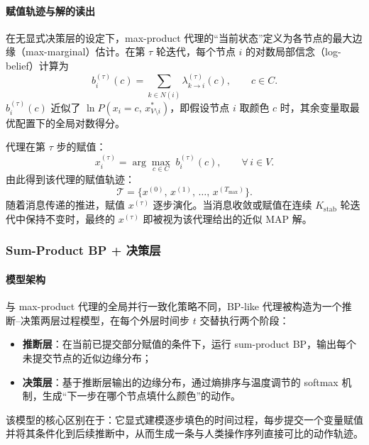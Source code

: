 \paragraph{赋值轨迹与解的读出}
在无显式决策层的设定下，max-product 代理的“当前状态”定义为各节点的最大边缘（max-marginal）估计。在第 $\tau$ 轮迭代，每个节点 $i$ 的对数局部信念（log-belief）计算为
\begin{equation}
  b_i^{(\tau)}(c)
  =
  \sum_{k\in N(i)} \lambda_{k\to i}^{(\tau)}(c),
  \qquad c\in C.
\end{equation}
$b_i^{(\tau)}(c)$ 近似了 $\ln P(x_i=c,\, x_{V\setminus i}^{*})$，即假设节点 $i$ 取颜色 $c$ 时，其余变量取最优配置下的全局对数得分。

代理在第 $\tau$ 步的赋值：
\begin{equation}
  x_i^{(\tau)}
  =
  \arg\max_{c\in C}\; b_i^{(\tau)}(c),
  \qquad \forall\, i\in V.
\end{equation}
由此得到该代理的赋值轨迹：
\begin{equation}
  \mathcal{T} = \bigl\{ x^{(0)},\, x^{(1)},\, \ldots,\, x^{(T_{\max})} \bigr\}.
\end{equation}
随着消息传递的推进，赋值 $x^{(\tau)}$ 逐步演化。当消息收敛或赋值在连续 $K_{\mathrm{stab}}$ 轮迭代中保持不变时，最终的 $x^{(\tau)}$ 即被视为该代理给出的近似 MAP 解。

\subsubsection{Sum-Product BP + 决策层}

\paragraph{模型架构}
与 max-product 代理的全局并行一致化策略不同，BP-like 代理被构造为一个推断--决策两层过程模型，在每个外层时间步 $t$ 交替执行两个阶段：
\begin{itemize}
  \item \textbf{推断层}：在当前已提交部分赋值的条件下，运行 sum-product BP，输出每个未提交节点的近似边缘分布；
  \item \textbf{决策层}：基于推断层输出的边缘分布，通过熵排序与温度调节的 softmax 机制，生成“下一步在哪个节点填什么颜色”的动作。
\end{itemize}
该模型的核心区别在于：它显式建模逐步填色的时间过程，每步提交一个变量赋值并将其条件化到后续推断中，从而生成一条与人类操作序列直接可比的动作轨迹。

